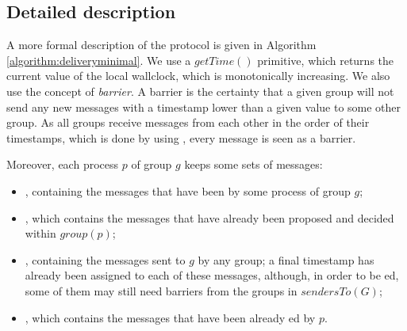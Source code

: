 \documentclass[times, 10pt]{article}
\begin{document}
\subsection{Detailed description}
\label{sec:detailed}

A more formal description of the protocol is given in Algorithm \ref{algorithm:deliveryminimal}. We use a $getTime()$ primitive, which returns the current value of the local wallclock, which is monotonically increasing. We also use the concept of \textit{barrier}. A barrier is the certainty that a given group will not send any new messages with a timestamp lower than a given value to some other group. As all groups receive messages from each other in the order of their timestamps, which is done by using \rmcast{}, every message is seen as a barrier.

Moreover, each process $p$ of group $g$ keeps some sets of messages:
\begin{itemize}
  \item \textit{\localmsgs}, containing the %
  messages that have been \amcast{} by some process of group $g$;
  \item \textit{\decided}, which contains the messages that have already been proposed and decided within $group(p)$;
  \item \textit{\stamped}, containing the messages sent to $g$ by any group; a final timestamp has already been assigned to each of these messages, although, in order to be \amdel{}ed, some of them may still need barriers from the groups in $sendersTo(G)$;
  \item \textit{\delivered}, which contains the messages that have been already \amdel{}ed by $p$.
\end{itemize} 


\end{document}
